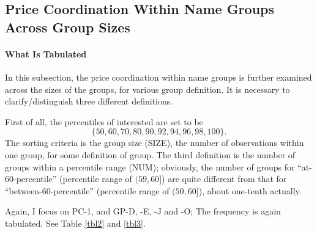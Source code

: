 \subsection{Price Coordination Within Name Groups Across Group Sizes}

\paragraph{What Is Tabulated}

In this subsection, the price coordination within name groups is further examined across the sizes of the groups, for various group definition. It is necessary to clarify/distinguish three different definitions.

First of all, the percentiles of interested are set to be \[ \{50,60,70, 80, 90, 92, 94, 96,  98, 100\}. \] The sorting criteria is the group size (SIZE), the number of observations within one group, for some definition of group. The third definition is the number of groups within a percentile range (NUM); obviously, the number of groups for ``at-60-percentile'' (percentile range of $ (59,60] $) are quite different from that for ``between-60-percentile'' (percentile range of $ (50,60] $), about one-tenth actually.

Again, I focus on PC-1, and GP-D, -E, -J and -O; The frequency is again tabulated. See Table \ref{tbl2} and \ref{tbl3}.

